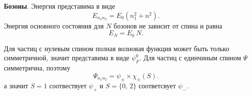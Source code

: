 \textbf{Бозоны}.  Энергия представима в виде
\begin{equation*}
	E_{n_1 n_2} = E_0 (n_1^2 + n^2).
\end{equation*}
Энергия основного состояния для $N$ бозонов не зависит от спина и равна
\begin{equation*}
	E_N = E_0 \ N.
\end{equation*}

Для частиц с нулевым спином полная волновая функция может быть только симметричной, значит представима в виде $\psi_F^0$.  Для частиц с единчиным спином $\Psi$ симметрична, поэтому
\begin{equation*}
	\Psi_{n_1 n_2} = \psi_{\pm} \times  \chi_{\pm}(S).
	\label{sympsi2}
\end{equation*}
а значит $S=1$ соотвествует $\psi_+$ и $S=\{0,\, 2\}$ соответсвует $\psi_-$. 




